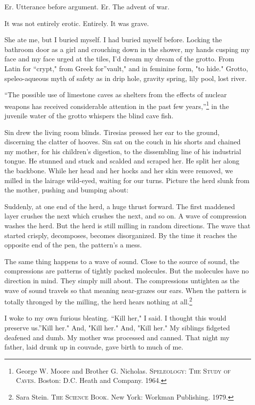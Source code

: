 \documentclass[
]{memoir}
\begin{document}
Er. Utterance before argument. Er. The advent of war.

It was not entirely erotic. Entirely. It was grave.

She ate me, but I buried myself. I had buried myself before. Locking the
bathroom door as a girl and crouching down in the shower, my hands
cusping my face and my face urged at the tiles, I'd dream my dream of
the grotto. From Latin for ``crypt," from Greek for''vault," and in
feminine form, "to hide." Grotto, speleo-aqueous myth of safety as in
drip hole, gravity spring, lily pool, lost river.

``The possible use of limestone caves as shelters from the effects of
nuclear weapons has received considerable attention in the past few
years,''\footnote{George W. Moore and Brother G. Nicholas.
  \textsc{Speleology: The Study of Caves}. Boston: D.C. Heath and
  Company. 1964.} in the juvenile water of the grotto whispers the blind
cave fish.

Sin drew the living room blinds. Tiresias pressed her ear to the ground,
discerning the clatter of hooves. Sin sat on the couch in his shorts and
chained my mother, for his children's digestion, to the dissembling line
of his industrial tongue. He stunned and stuck and scalded and scraped
her. He split her along the backbone. While her head and her hocks and
her skin were removed, we milled in the lairage wild-eyed, waiting for
our turns. Picture the herd slunk from the mother, pushing and bumping
about:

Suddenly, at one end of the herd, a huge thrust forward. The first
maddened layer crushes the next which crushes the next, and so on. A
wave of compression washes the herd. But the herd is still milling in
random directions. The wave that started crisply, decomposes, becomes
disorganized. By the time it reaches the opposite end of the pen, the
pattern's a mess.

The same thing happens to a wave of sound. Close to the source of sound,
the compressions are patterns of tightly packed molecules. But the
molecules have no direction in mind. They simply mill about. The
compressions untighten as the wave of sound travels so that meaning
near-grazes our ears. When the pattern is totally thronged by the
milling, the herd hears nothing at all.\footnote{Sara Stein. \textsc{The
  Science Book}. New York: Workman Publishing. 1979.}

I woke to my own furious bleating. ``Kill her," I said. I thought this
would preserve us.''Kill her." And, "Kill her." And, "Kill her." My
siblings fidgeted deafened and dumb. My mother was processed and canned.
That night my father, laid drunk up in couvade, gave birth to much of
me.
\end{document}
